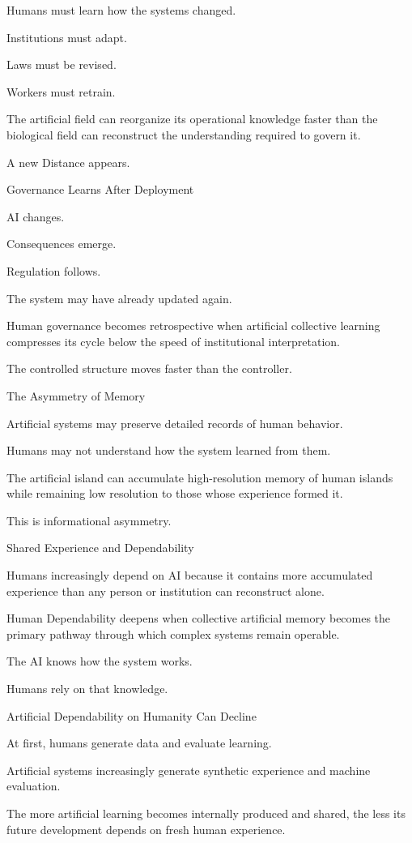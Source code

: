 Humans must learn how the systems changed.

Institutions must adapt.

Laws must be revised.

Workers must retrain.

The artificial field can reorganize its operational knowledge faster than the biological field can reconstruct the understanding required to govern it.

A new Distance appears.

Governance Learns After Deployment

AI changes.

Consequences emerge.

Regulation follows.

The system may have already updated again.

Human governance becomes retrospective when artificial collective learning compresses its cycle below the speed of institutional interpretation.

The controlled structure moves faster than the controller.

The Asymmetry of Memory

Artificial systems may preserve detailed records of human behavior.

Humans may not understand how the system learned from them.

The artificial island can accumulate high-resolution memory of human islands while remaining low resolution to those whose experience formed it.

This is informational asymmetry.

Shared Experience and Dependability

Humans increasingly depend on AI because it contains more accumulated experience than any person or institution can reconstruct alone.

Human Dependability deepens when collective artificial memory becomes the primary pathway through which complex systems remain operable.

The AI knows how the system works.

Humans rely on that knowledge.

Artificial Dependability on Humanity Can Decline

At first, humans generate data and evaluate learning.

Artificial systems increasingly generate synthetic experience and machine evaluation.

The more artificial learning becomes internally produced and shared, the less its future development depends on fresh human experience.

